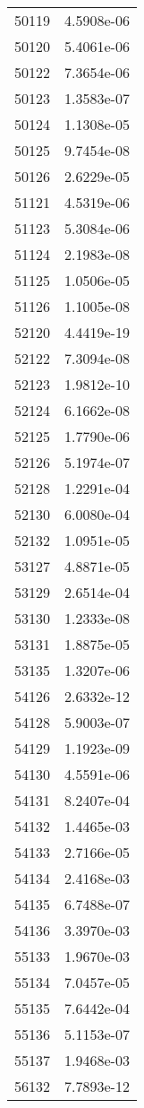 \begin{table}[h!]
\begin{tabular}{|| c || c |}
50119 & 4.5908e-06 \\
50120 & 5.4061e-06 \\
50122 & 7.3654e-06 \\
50123 & 1.3583e-07 \\
50124 & 1.1308e-05 \\
50125 & 9.7454e-08 \\
50126 & 2.6229e-05 \\
51121 & 4.5319e-06 \\
51123 & 5.3084e-06 \\
51124 & 2.1983e-08 \\
51125 & 1.0506e-05 \\
51126 & 1.1005e-08 \\
52120 & 4.4419e-19 \\
52122 & 7.3094e-08 \\
52123 & 1.9812e-10 \\
52124 & 6.1662e-08 \\
52125 & 1.7790e-06 \\
52126 & 5.1974e-07 \\
52128 & 1.2291e-04 \\
52130 & 6.0080e-04 \\
52132 & 1.0951e-05 \\
53127 & 4.8871e-05 \\
53129 & 2.6514e-04 \\
53130 & 1.2333e-08 \\
53131 & 1.8875e-05 \\
53135 & 1.3207e-06 \\
54126 & 2.6332e-12 \\
54128 & 5.9003e-07 \\
54129 & 1.1923e-09 \\
54130 & 4.5591e-06 \\
54131 & 8.2407e-04 \\
54132 & 1.4465e-03 \\
54133 & 2.7166e-05 \\
54134 & 2.4168e-03 \\
54135 & 6.7488e-07 \\
54136 & 3.3970e-03 \\
55133 & 1.9670e-03 \\
55134 & 7.0457e-05 \\
55135 & 7.6442e-04 \\
55136 & 5.1153e-07 \\
55137 & 1.9468e-03 \\
56132 & 7.7893e-12 \\

\end{tabular}
\end{table}
